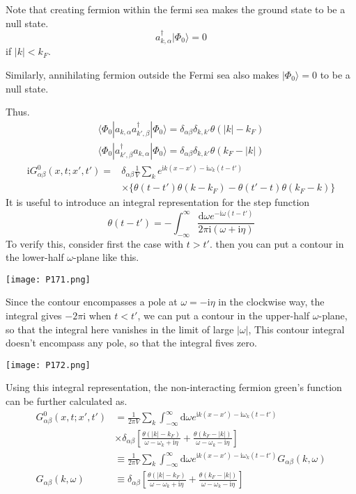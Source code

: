 Note that creating fermion within the fermi sea makes the ground state to be a null state.
\begin{equation}
a^{\dagger}_{k,\alpha} |\Phi_0\rangle=0 \nonumber
\end{equation}
if $|k|<k_F$.

Similarly, annihilating fermion outside the Fermi sea also makes $|\Phi_0\rangle=0$ to be a null state.

Thus.
\begin{align}
 \langle\Phi_0|a_{k,\alpha}a^{\dagger}_{k',\beta}|\Phi_0\rangle=\delta_{\alpha\beta}\delta_{k,k'}\theta(|k|-k_F) \nonumber \\ \langle\Phi_0|a^{\dagger}_{k',\beta}a_{k,\alpha}|\Phi_0\rangle=\delta_{\alpha\beta}\delta_{k,k'}\theta(k_F-|k|) \nonumber 
\end{align}
\begin{align}
\mathrm{i}G^0_{\alpha\beta}(x,t;x',t')=&\delta_{\alpha\beta}\frac{1}{V}\sum_{k}e^{\mathrm{i}k(x-x')-\mathrm{i}\omega_{k}(t-t')} \nonumber\\
&\times\{\theta(t-t')\theta(k-k_F)-\theta(t'-t)\theta(k_F-k)\} \nonumber
\end{align}
It is useful to introduce an integral representation for the step function
\begin{equation}
\theta(t-t')=-\int_{-\infty}^{\infty} \frac{\mathrm{d}\omega e^{-\mathrm{i}\omega(t-t')}}{2\pi\mathrm{i}(\omega+\mathrm{i}\eta)} \nonumber
\end{equation}
To verify this, consider first the case with $t>t'$. then you can put a contour in the lower-half $\omega$-plane like this.
\begin{center}
\texttt{[image: P171.png]}
\end{center}
Since the contour encompasses a pole at $\omega=-\mathrm{i}\eta$ in the clockwise way, the integral gives $-2\pi\mathrm{i}$ when $t<t'$, we can put a contour in the upper-half $\omega$-plane, so that the integral here vanishes in the limit of large $|\omega|$, This contour integral doesn't encompass any pole, so that the integral fives zero.

\begin{center}
\texttt{[image: P172.png]}
\end{center}
Using this integral representation, the non-interacting fermion green's function can be further calculated as.  
\begin{align}\label{2.3.6}
G^0_{\alpha\beta}(x,t;x',t')&=\frac{1}{2\pi V}\sum_k \int_{-\infty}^{\infty} \mathrm{d}\omega e^{\mathrm{i}k(x-x')-\mathrm{i}\omega_{k}(t-t')} \nonumber \\
& \times \delta_{\alpha\beta}[\frac{\theta(|k|-k_F)}{\omega-\omega_k+\mathrm{i}\eta}+\frac{\theta(k_F-|k|)}{\omega-\omega_k-\mathrm{i}\eta}] \nonumber \\
&\equiv \frac{1}{2\pi V}\sum_k \int_{-\infty}^{\infty}\mathrm{d}\omega e^{\mathrm{i}k(x-x')-\mathrm{i}\omega_{k}(t-t')} G_{\alpha\beta}(k,\omega) \nonumber \\
G_{\alpha\beta}(k,\omega)&\equiv \delta_{\alpha\beta}[\frac{\theta(|k|-k_F)}{\omega-\omega_k+\mathrm{i}\eta}+\frac{\theta(k_F-|k|)}{\omega-\omega_k-\mathrm{i}\eta}] 
\end{align}

